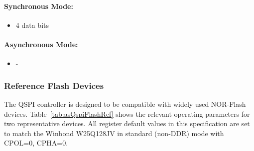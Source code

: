 \paragraph{Synchronous Mode: }
\begin{itemize}
  \item 4 data bits
\end{itemize}

\paragraph{Asynchronous Mode: }
\begin{itemize}
  \item -
\end{itemize}

\subsubsection{Reference Flash Devices}

The QSPI controller is designed to be compatible with widely used NOR-Flash devices.
Table~\ref{tab:asQspiFlashRef} shows the relevant operating parameters for two
representative devices. All register default values in this specification are
set to match the Winbond W25Q128JV in standard (non-DDR) mode with CPOL=0, CPHA=0.

